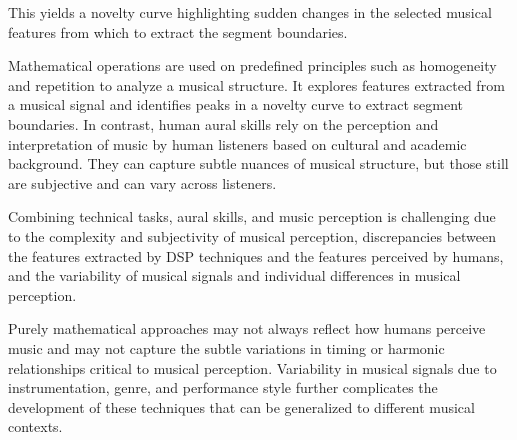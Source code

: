 

This yields a novelty curve highlighting sudden changes in the selected musical features from which to extract the segment boundaries.



Mathematical operations are used on predefined principles such as homogeneity and repetition to analyze a musical structure. It explores features extracted from a musical signal and identifies peaks in a novelty curve to extract segment boundaries. In contrast, human aural skills rely on the perception and interpretation of music by human listeners based on cultural and academic background. They can capture subtle nuances of musical structure, but those still are subjective and can vary across listeners.

Combining technical tasks, aural skills, and music perception is challenging due to the complexity and subjectivity of musical perception, discrepancies between the features extracted by DSP techniques and the features perceived by humans, and the variability of musical signals and individual differences in musical perception. 

Purely mathematical approaches may not always reflect how humans perceive music and may not capture the subtle variations in timing or harmonic relationships critical to musical perception. Variability in musical signals due to instrumentation, genre, and performance style further complicates the development of these techniques that can be generalized to different musical contexts.